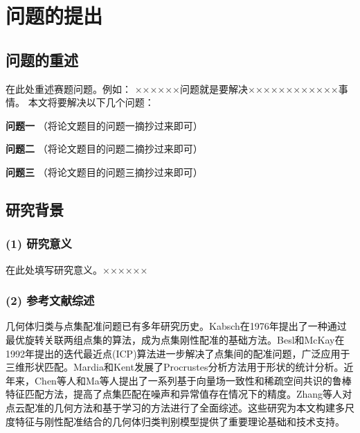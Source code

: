 \section{问题的提出}
\subsection{问题的重述}
在此处重述赛题问题。例如：
××××××问题就是要解决××××××××××××事情。
本文将要解决以下几个问题：

\textbf{问题一} （将论文题目的问题一摘抄过来即可）

\textbf{问题二} （将论文题目的问题二摘抄过来即可）

\textbf{问题三} （将论文题目的问题三摘抄过来即可）

\subsection{研究背景}
\subsubsection*{(1) 研究意义} %
在此处填写研究意义。××××××

\subsubsection*{(2) 参考文献综述}
几何体归类与点集配准问题已有多年研究历史。Kabsch\cite{kabsch1976solution}在1976年提出了一种通过最优旋转关联两组点集的算法，成为点集刚性配准的基础方法。Besl和McKay\cite{besl1992method}在1992年提出的迭代最近点(ICP)算法进一步解决了点集间的配准问题，广泛应用于三维形状匹配。Mardia和Kent\cite{mardia1987procrustes}发展了Procrustes分析方法用于形状的统计分析。近年来，Chen等人\cite{chen2015robust}和Ma等人\cite{ma2014robust}提出了一系列基于向量场一致性和稀疏空间共识的鲁棒特征匹配方法，提高了点集匹配在噪声和异常值存在情况下的精度。Zhang等人\cite{zhang2020recent}对点云配准的几何方法和基于学习的方法进行了全面综述。这些研究为本文构建多尺度特征与刚性配准结合的几何体归类判别模型提供了重要理论基础和技术支持。



